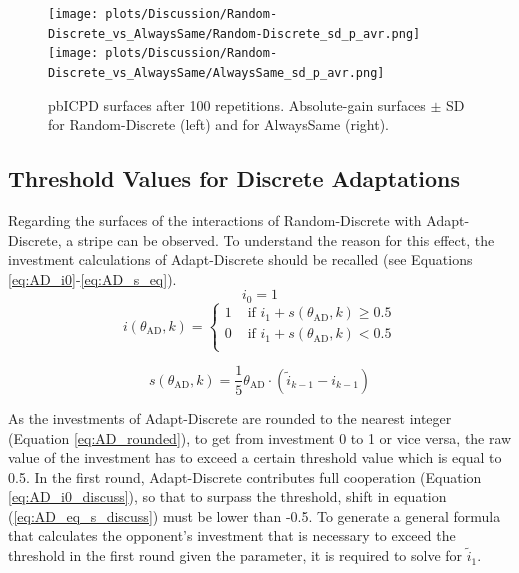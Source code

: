 \documentclass[11pt]{article}
\newcommand{\round}[1]{\ensuremath{\lfloor#1\rceil}}
\begin{document}
	\begin{figure}[h]
		\centering
		\texttt{[image: plots/Discussion/Random-Discrete\_vs\_AlwaysSame/Random-Discrete\_sd\_p\_avr.png]}
		\texttt{[image: plots/Discussion/Random-Discrete\_vs\_AlwaysSame/AlwaysSame\_sd\_p\_avr.png]}
		\caption{pbICPD surfaces after 100 repetitions. Absolute-gain surfaces $\pm$ SD for Random-Discrete (left) and for AlwaysSame (right).}
		\label{fig:SD_avr}
	\end{figure}

\subsection{Threshold Values for Discrete Adaptations} \label{sec:RndD_vs_AdpD}
		
	Regarding the surfaces of the interactions of Random-Discrete with Adapt-Discrete, a stripe can be observed.
	To understand the reason for this effect, the investment calculations of Adapt-Discrete should be recalled (see Equations \ref{eq:AD_i0}-\ref{eq:AD_s_eq}).
	\begin{equation}
		i_0 = 1
		\label{eq:AD_i0_discuss}
	\end{equation}
	\begin{equation}
		i(\theta_{\mathrm{AD}}, k) =
		\begin{cases}
			1 & \text{ if } i_1 + s(\theta_{\mathrm{AD}}, k) \ge 0.5\\
			0 & \text{ if } i_1 + s(\theta_{\mathrm{AD}}, k) < 0.5\\
		\end{cases}
		\label{eq:AD_rounded}
	\end{equation}

	\begin{equation}
		s(\theta_{\mathrm{AD}}, k) = \frac{1}{5} \theta_{\mathrm{AD}} \cdot (\tilde{i}_{k-1} - i_{k-1})
		\label{eq:AD_eq_s_discuss}
	\end{equation}

	\noindent
	As the investments of Adapt-Discrete are rounded to the nearest integer (Equation \ref{eq:AD_rounded}), to get from investment 0 to 1 or vice versa, the raw value of the investment has to exceed a certain threshold value which is equal to 0.5.
	In the first round, Adapt-Discrete contributes full cooperation (Equation \ref{eq:AD_i0_discuss}), so that to surpass the threshold, shift in equation (\ref{eq:AD_eq_s_discuss}) must be lower than -0.5.
	To generate a general formula that calculates the opponent's investment that is necessary to exceed the threshold in the first round given the parameter, it is required to solve for $\tilde{i}_1$.
\end{document}
